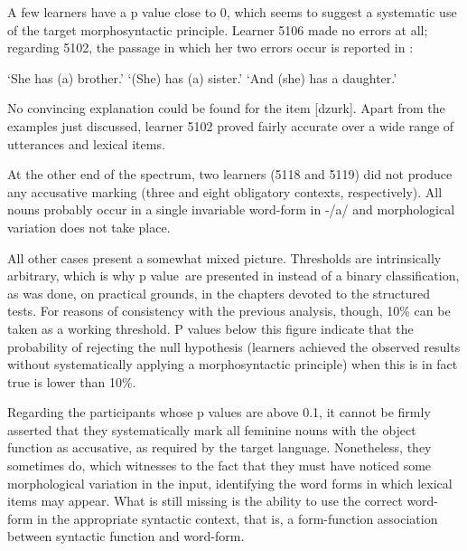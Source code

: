 A few learners have a p value close to 0, which seems to suggest a systematic use of the target morphosyntactic principle. Learner 5106 made no errors at all; regarding 5102, the passage in which her two errors occur is reported in :

\ea%
    \label{ex:07:8}
    \ea{\label{ex:07:8a}
    \gll    [ɔna   ɔn   ma  brat-a].\\
            \hspaceThis{[}she  he  has  brother-\textsc{acc}\\}
    \glt    ‘She has (a) brother.’
    \ex{\label{ex:07:8b}
    \gll    [ma   siostr-a].\\
            \hspaceThis{[}has  sister-\textsc{nom}\\}
    \glt    ‘(She) has (a) sister.’
    \ex{\label{ex:07:8c}
    \gll    [i  ma  dzurk].\\
            \hspaceThis{[}and  has  daughter.?\\}
    \glt    ‘And (she) has a daughter.’
    \z
\z

No convincing explanation could be found for the item [dzurk]. Apart from the examples just discussed, learner 5102 proved fairly accurate over a wide range of utterances and lexical items. 

At the other end of the spectrum, two learners (5118 and 5119) did not produce any accusative marking (three and eight obligatory contexts, respectively). All nouns probably occur in a single invariable word-form in -/a/ and morphological variation does not take place.

All other cases present a somewhat mixed picture. Thresholds are intrinsically arbitrary, which is why p value~are presented in  instead of a binary classification, as was done, on practical grounds, in the chapters devoted to the structured tests. For reasons of consistency with the previous analysis, though, 10\% can be taken as a working threshold. P values below this figure indicate that the probability of rejecting the null hypothesis (learners achieved the observed results without systematically applying a morphosyntactic principle) when this is in fact true is lower than 10\%.  

Regarding the participants whose p values are above 0.1, it cannot be firmly asserted that they systematically mark all feminine nouns with the object function as accusative, as required by the target language. Nonetheless, they sometimes do, which witnesses to the fact that they must have noticed some morphological variation in the input, identifying the word forms in which lexical items may appear. What is still missing is the ability to use the correct word-form in the appropriate syntactic context, that is, a form-function association between syntactic function and word-form. 

